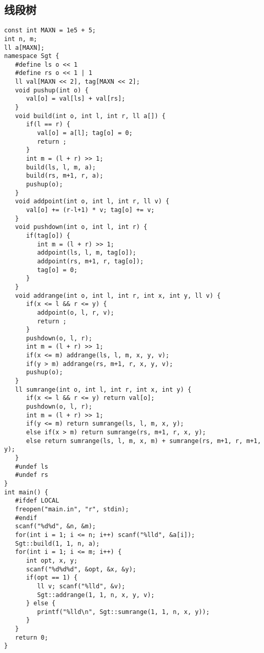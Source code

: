 \documentclass{article}
\begin{document}
   \subsection{线段树}
   \begin{lstlisting}
const int MAXN = 1e5 + 5;
int n, m;
ll a[MAXN];
namespace Sgt {
   #define ls o << 1
   #define rs o << 1 | 1
   ll val[MAXN << 2], tag[MAXN << 2];
   void pushup(int o) {
      val[o] = val[ls] + val[rs];
   }
   void build(int o, int l, int r, ll a[]) {
      if(l == r) {
         val[o] = a[l]; tag[o] = 0;
         return ;
      }
      int m = (l + r) >> 1;
      build(ls, l, m, a);
      build(rs, m+1, r, a);
      pushup(o);
   }
   void addpoint(int o, int l, int r, ll v) {
      val[o] += (r-l+1) * v; tag[o] += v;
   }
   void pushdown(int o, int l, int r) {
      if(tag[o]) {
         int m = (l + r) >> 1;
         addpoint(ls, l, m, tag[o]);
         addpoint(rs, m+1, r, tag[o]);
         tag[o] = 0;
      }
   }
   void addrange(int o, int l, int r, int x, int y, ll v) {
      if(x <= l && r <= y) {
         addpoint(o, l, r, v);
         return ;
      }
      pushdown(o, l, r);
      int m = (l + r) >> 1;
      if(x <= m) addrange(ls, l, m, x, y, v);
      if(y > m) addrange(rs, m+1, r, x, y, v);
      pushup(o);
   }
   ll sumrange(int o, int l, int r, int x, int y) {
      if(x <= l && r <= y) return val[o];
      pushdown(o, l, r);
      int m = (l + r) >> 1;
      if(y <= m) return sumrange(ls, l, m, x, y);
      else if(x > m) return sumrange(rs, m+1, r, x, y);
      else return sumrange(ls, l, m, x, m) + sumrange(rs, m+1, r, m+1, y);
   }
   #undef ls
   #undef rs
}
int main() {
   #ifdef LOCAL
   freopen("main.in", "r", stdin);
   #endif
   scanf("%d%d", &n, &m);
   for(int i = 1; i <= n; i++) scanf("%lld", &a[i]);
   Sgt::build(1, 1, n, a);
   for(int i = 1; i <= m; i++) {
      int opt, x, y;
      scanf("%d%d%d", &opt, &x, &y);
      if(opt == 1) {
         ll v; scanf("%lld", &v);
         Sgt::addrange(1, 1, n, x, y, v);
      } else {
         printf("%lld\n", Sgt::sumrange(1, 1, n, x, y));
      }
   }
   return 0;
}
   \end{lstlisting}
\end{document}
